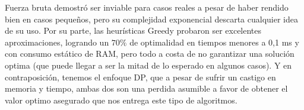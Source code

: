 Fuerza bruta demostró ser inviable para casos reales a pesar de haber rendido bien en casos pequeños, pero
su complejidad exponencial descarta cualquier idea de su uso. Por su parte, las heurísticas Greedy probaron
ser excelentes aproximaciones, logrando un $70\%$ de optimalidad en tiempos menores a 0,1 ms y con consumo
estático de RAM, pero todo a costa de no garantizar una solución optima (que puede llegar a ser la mitad de 
lo esperado en algunos casos). Y en contraposición, tenemos el enfoque DP, que a pesar de sufrir un castigo
en memoria y tiempo, ambas dos son una perdida asumible a favor de obtener el valor optimo asegurado que nos
entrega este tipo de algoritmos.